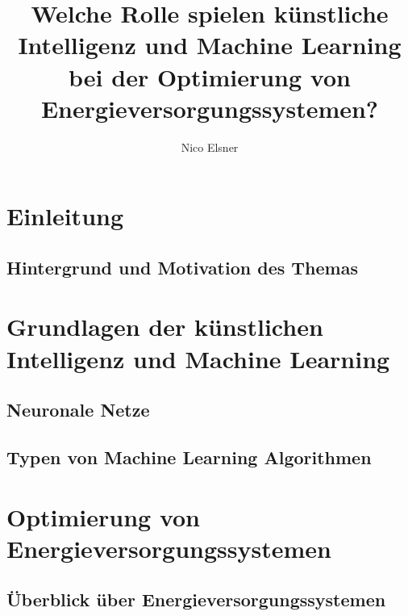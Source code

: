 \documentclass[conference]{IEEEtran}
\title{Welche Rolle spielen künstliche Intelligenz und Machine Learning bei der Optimierung von Energieversorgungssystemen?}
\author{{\Large Nico Elsner}}
\begin{document}
	\maketitle
	\begin{abstract}
		
	\end{abstract}
	\section{Einleitung}
	\subsection{Hintergrund und Motivation des Themas}
	


	\section{Grundlagen der künstlichen Intelligenz und Machine Learning}
	
	\subsection{Neuronale Netze}
	
	\subsection{Typen von Machine Learning Algorithmen}
	

	\section{Optimierung von Energieversorgungssystemen}
	
	\subsection{Überblick über Energieversorgungssystemen}
	
\end{document}
